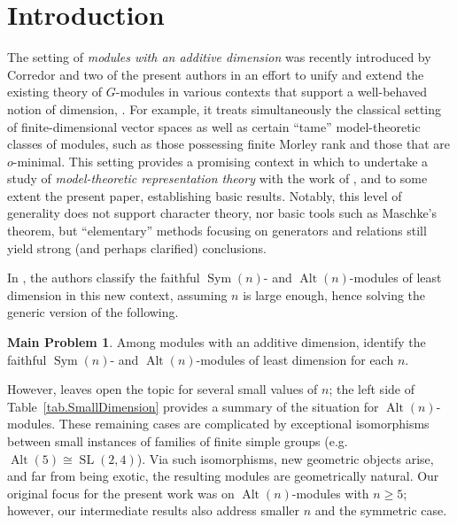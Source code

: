\documentclass[a4paper, 11pt]{amsart}
\theoremstyle{plain}
\theoremstyle{definition}
\newtheorem*{problem*}{Main Problem}
\theoremstyle{remark}
\DeclareMathOperator{\Sym}{Sym}
\DeclareMathOperator{\Alt}{Alt}
\DeclareMathOperator{\SL}{SL}
\begin{document}
\section{Introduction}\label{S.Intro}
The setting of \emph{modules with an additive dimension} was recently introduced by Corredor and two of the present authors in an effort to unify and extend the existing theory of $G$-modules in various  contexts that support a well-behaved notion of dimension, \cite{CDW23}. For example, it treats simultaneously the classical setting of finite-dimensional vector spaces as well as certain ``tame'' model-theoretic classes of modules, such as those possessing finite Morley rank and those that are $o$-minimal. This setting provides a promising context in which to undertake  a  study of \emph{model-theoretic representation theory} with the work of \cite{CDW23}, and to some extent the present paper, establishing  basic results. Notably, this level of generality does not support character theory, nor basic tools such as Maschke's theorem, but ``elementary'' methods focusing on generators and relations still yield strong (and perhaps clarified) conclusions.

In \cite{CDW23}, the authors classify the faithful %
$\Sym(n)$- and $\Alt(n)$-modules of least dimension in this new context, assuming $n$ is large enough, hence solving the generic version of the following.

\begin{problem*}
Among modules with an additive dimension, identify the faithful $\Sym(n)$- and $\Alt(n)$-modules of least dimension for each $n$. 
\end{problem*}
However, \cite{CDW23} leaves open the topic for several small values of $n$; the left side of Table~\ref{tab.SmallDimension} provides a summary of the situation for $\Alt(n)$-modules. These remaining cases are complicated by exceptional isomorphisms between small instances of families of finite simple groups (e.g.~$\Alt(5) \cong \SL(2, 4)$). Via such isomorphisms, new geometric objects arise, and far from being exotic, the resulting modules are geometrically natural.
Our original focus for the present work was on $\Alt(n)$-modules with $n\ge 5$; however, our intermediate results also address smaller $n$ and the symmetric case.  
\end{document}
